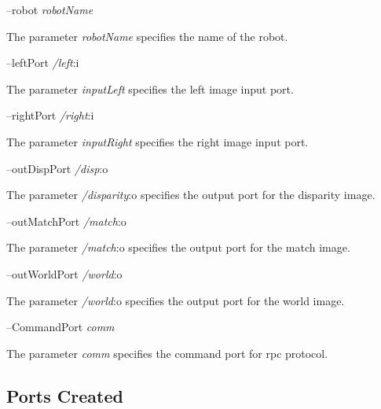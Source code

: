 --robot {\itshape robot\+Name} 
\begin{DoxyItemize}
\item The parameter {\itshape robot\+Name} specifies the name of the robot.
\end{DoxyItemize}

--left\+Port {\itshape /left}\+:i
\begin{DoxyItemize}
\item The parameter {\itshape input\+Left} specifies the left image input port.
\end{DoxyItemize}

--right\+Port {\itshape /right}\+:i
\begin{DoxyItemize}
\item The parameter {\itshape input\+Right} specifies the right image input port.
\end{DoxyItemize}

--out\+Disp\+Port {\itshape /disp}\+:o
\begin{DoxyItemize}
\item The parameter {\itshape /disparity}\+:o specifies the output port for the disparity image.
\end{DoxyItemize}

--out\+Match\+Port {\itshape /match}\+:o
\begin{DoxyItemize}
\item The parameter {\itshape /match}\+:o specifies the output port for the match image.
\end{DoxyItemize}

--out\+World\+Port {\itshape /world}\+:o
\begin{DoxyItemize}
\item The parameter {\itshape /world}\+:o specifies the output port for the world image.
\end{DoxyItemize}

--Command\+Port {\itshape comm} 
\begin{DoxyItemize}
\item The parameter {\itshape comm} specifies the command port for rpc protocol.
\end{DoxyItemize}\hypertarget{group__SFM_portsc_sec}{}\subsection{Ports Created}\label{group__SFM_portsc_sec}

